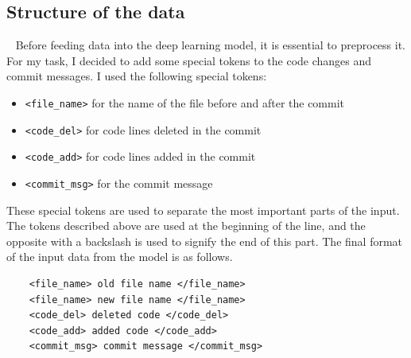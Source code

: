     

 \subsection{Structure of the data}~\label{subsec:structure_of_the_data}
 Before feeding data into the deep learning model, it is essential to preprocess it. For my task, I decided to add some special tokens to the code changes and commit messages. 
 I used the following special tokens:
\begin{itemize}
    \item \verb+<file_name>+ for the name of the file before and after the commit
    \item \verb+<code_del>+ for code lines deleted in the commit
    \item \verb+<code_add>+ for code lines added in the commit
    \item \verb+<commit_msg>+ for the commit message
\end{itemize}
These special tokens are used to separate the most important parts of the input. The tokens described above are used at the beginning of the line, and the opposite with a backslash is used to signify the end of this part. The final format of the input data from the model is as follows.
 
 \begin{verbatim}
    <file_name> old file name </file_name>
    <file_name> new file name </file_name>
    <code_del> deleted code </code_del>
    <code_add> added code </code_add>
    <commit_msg> commit message </commit_msg>
\end{verbatim}
